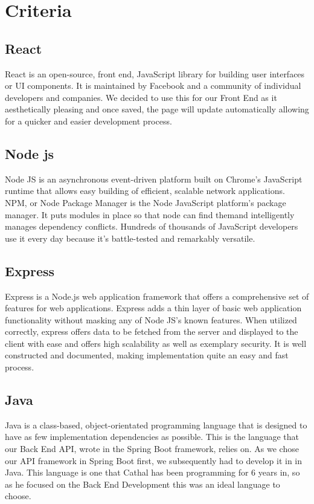 \section{Criteria}
\subsection{React}
React is an open-source, front end, JavaScript library for building user interfaces or UI components. It is maintained by Facebook and a community of individual developers and companies. We decided to use this for our Front End as it aesthetically pleasing and once saved, the page will update automatically allowing for a quicker and easier development process.

\subsection{Node js}
\cite{NodsJS}Node JS is an asynchronous event-driven platform built on Chrome's JavaScript runtime that allows easy building of efficient, scalable network applications. NPM, or Node Package Manager is the Node JavaScript platform's package manager. It puts modules in place so that node can find themand intelligently manages dependency conflicts. Hundreds of thousands of JavaScript developers use it every day because it's battle-tested and remarkably versatile.

\subsection{Express}
\cite{ExpressJS}Express is a Node.js web application framework that offers a comprehensive set of features for web applications. Express adds a thin layer of basic web application functionality without masking any of Node JS's known features. When utilized correctly, express offers data to be fetched from the server and displayed to the client with ease and offers high scalability as well as exemplary security. It is well constructed and documented, making implementation quite an easy and fast process.

\subsection{Java}
Java is a class-based, object-orientated programming language that is designed to have as few implementation dependencies as possible. This is the language that our Back End API, wrote in the Spring Boot framework, relies on. As we chose our API framework in Spring Boot first, we subsequently had to develop it in in Java. This language is one that Cathal has been programming for 6 years in, so as he focused on the Back End Development this was an ideal language to choose.

